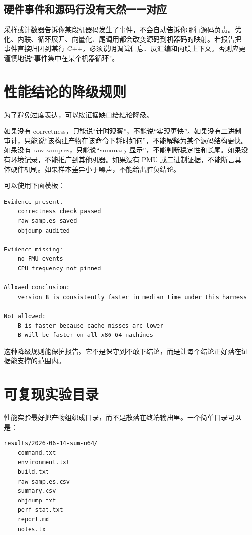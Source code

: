 \subsection{硬件事件和源码行没有天然一一对应}

采样或计数器告诉你某段机器码发生了事件，不会自动告诉你哪行源码负责。优化、内联、循环展开、向量化、尾调用都会改变源码到机器码的映射。若报告把  事件直接归因到某行 C++，必须说明调试信息、反汇编和内联上下文。否则应更谨慎地说“事件集中在某个机器循环”。

\section{性能结论的降级规则}

为了避免过度表达，可以按证据缺口给结论降级。

如果没有 correctness，只能说“计时观察”，不能说“实现更快”。如果没有二进制审计，只能说“该构建产物在该命令下耗时如何”，不能解释为某个源码结构更快。如果没有 raw samples，只能说“summary 显示”，不能判断稳定性和长尾。如果没有环境记录，不能推广到其他机器。如果没有 PMU 或二进制证据，不能断言具体硬件机制。如果样本差异小于噪声，不能给出胜负结论。

可以使用下面模板：

\begin{lstlisting}
Evidence present:
    correctness check passed
    raw samples saved
    objdump audited

Evidence missing:
    no PMU events
    CPU frequency not pinned

Allowed conclusion:
    version B is consistently faster in median time under this harness

Not allowed:
    B is faster because cache misses are lower
    B will be faster on all x86-64 machines
\end{lstlisting}

这种降级规则能保护报告。它不是保守到不敢下结论，而是让每个结论正好落在证据能支撑的范围内。

\section{可复现实验目录}

性能实验最好把产物组织成目录，而不是散落在终端输出里。一个简单目录可以是：

\begin{lstlisting}
results/2026-06-14-sum-u64/
    command.txt
    environment.txt
    build.txt
    raw_samples.csv
    summary.csv
    objdump.txt
    perf_stat.txt
    report.md
    notes.txt
\end{lstlisting}

